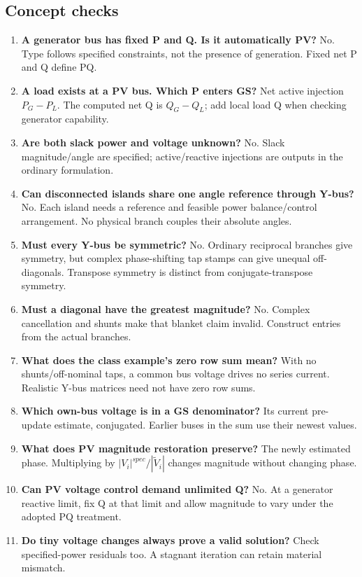 \documentclass[11pt,a4paper]{article}
\begin{document}
\subsection{Concept checks}
\begin{enumerate}
\item \textbf{A generator bus has fixed P and Q. Is it automatically PV?} No. Type follows specified constraints, not the presence of generation. Fixed net P and Q define PQ.
\item \textbf{A load exists at a PV bus. Which P enters GS?} Net active injection $P_G-P_L$. The computed net Q is $Q_G-Q_L$; add local load Q when checking generator capability.
\item \textbf{Are both slack power and voltage unknown?} No. Slack magnitude/angle are specified; active/reactive injections are outputs in the ordinary formulation.
\item \textbf{Can disconnected islands share one angle reference through Y-bus?} No. Each island needs a reference and feasible power balance/control arrangement. No physical branch couples their absolute angles.
\item \textbf{Must every Y-bus be symmetric?} No. Ordinary reciprocal branches give symmetry, but complex phase-shifting tap stamps can give unequal off-diagonals. Transpose symmetry is distinct from conjugate-transpose symmetry.
\item \textbf{Must a diagonal have the greatest magnitude?} No. Complex cancellation and shunts make that blanket claim invalid. Construct entries from the actual branches.
\item \textbf{What does the class example's zero row sum mean?} With no shunts/off-nominal taps, a common bus voltage drives no series current. Realistic Y-bus matrices need not have zero row sums.
\item \textbf{Which own-bus voltage is in a GS denominator?} Its current pre-update estimate, conjugated. Earlier buses in the sum use their newest values.
\item \textbf{What does PV magnitude restoration preserve?} The newly estimated phase. Multiplying by $|V_i|^{spec}/|\widetilde V_i|$ changes magnitude without changing phase.
\item \textbf{Can PV voltage control demand unlimited Q?} No. At a generator reactive limit, fix Q at that limit and allow magnitude to vary under the adopted PQ treatment.
\item \textbf{Do tiny voltage changes always prove a valid solution?} Check specified-power residuals too. A stagnant iteration can retain material mismatch.

\end{enumerate}
\end{document}
